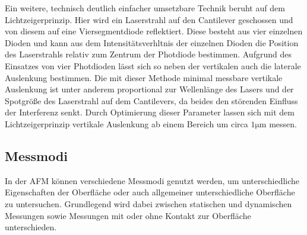           Ein weitere, technisch deutlich einfacher umsetzbare Technik beruht auf dem Lichtzeigerprinzip. Hier wird ein Laserstrahl auf den Cantilever geschossen und von diesem auf eine Viersegmentdiode 
          reflektiert. Diese besteht aus vier einzelnen Dioden und kann aus dem Intensitätsverhltnis der einzelnen Dioden die Position des Laserstrahls relativ zum Zentrum der Photdiode bestimmen. Aufgrund
          des Einsatzes von vier Photdioden lässt sich so neben der vertikalen auch die laterale Auslenkung bestimmen. Die mit dieser Methode minimal messbare vertikale Auslenkung ist unter anderem proportional
          zur Wellenlänge des Lasers und der Spotgröße des Laserstrahl auf dem Cantilevers, da beides den störenden Einfluss der Interferenz senkt. Durch Optimierung dieser Parameter lassen sich mit dem
          Lichtzeigerprinzip vertikale Auslenkung ab einem Bereich um circa $1 \si{\micro\metre}$ messen.  

      

      \newpage
      \subsection{Messmodi}
          In der AFM können verschiedene Messmodi genutzt werden, um unterschiedliche Eigenschaften der Oberfläche oder auch allgemeiner unterschiedliche Oberfläche zu untersuchen. Grundlegend wird dabei 
          zwischen statischen und dynamischen Messungen sowie Messungen mit oder ohne Kontakt zur Oberfläche unterschieden. 

